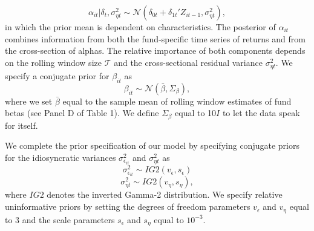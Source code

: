 \begin{equation}
    \alpha_{it}| \delta_t,\sigma^2_{\eta t} \sim \mathcal{N}(\delta_{0t}+\delta_{1t}'Z_{it-1},\sigma^2_{\eta t}), 
\end{equation}
in which the prior mean is dependent on characteristics. The posterior of $\alpha_{it}$ combines information from both the fund-specific time series of returns and from the cross-section of alphas. The relative importance of both components depends on the rolling window size $\mathcal{T}$ and the cross-sectional residual variance $\sigma^2_{\eta t}$. We specify a conjugate prior for $\beta_{it}$ as 
\begin{equation}
    \beta_{it} \sim \mathcal{N}(\bar{\beta},\Sigma_{\beta}), 
\end{equation}
where we set $\bar{\beta}$ equal to the sample mean of rolling window estimates of fund betas (see Panel D of Table 1). We define $\Sigma_\beta$ equal to 10$I$ to let the data speak for itself.
\par We complete the prior specification of our model by specifying conjugate priors for the idiosyncratic variances $\sigma^2_{\epsilon_{it}}$ and $\sigma^2_{\eta t}$ as
\begin{equation}
    \sigma^2_{\epsilon_{it}} \sim IG2(v_{\epsilon},s_\epsilon)  
\end{equation}
\begin{equation}
    \sigma^2_{\eta t} \sim IG2(v_{\eta},s_\eta), 
\end{equation}
where $IG2$ denotes the inverted Gamma-2 distribution. We specify relative uninformative priors by setting the degrees of freedom parameters $v_{\epsilon}$ and $v_{\eta}$ equal to 3 and the scale parameters $s_{\epsilon}$ and $s_{\eta}$ equal to $10^{-3}$. 

